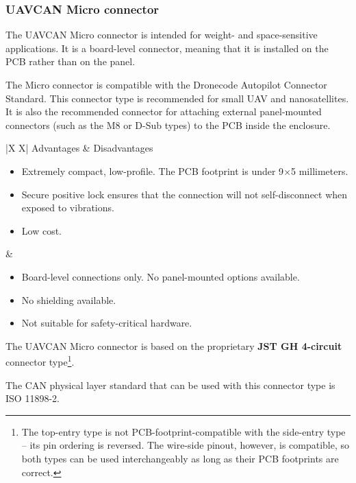 \clearpage  %
\subsubsection{UAVCAN Micro connector}

The UAVCAN Micro connector is intended for weight- and space-sensitive applications.
It is a board-level connector, meaning that it is installed on the PCB rather than on the panel.

The Micro connector is compatible with the Dronecode Autopilot Connector Standard.
This connector type is recommended for small UAV and nanosatellites.
It is also the recommended connector for attaching external panel-mounted connectors
(such as the M8 or D-Sub types) to the PCB inside the enclosure.

{
\NoLeftSkip
\begin{UAVCANCompactTable}{|X X|}
    Advantages & Disadvantages \\
    \begin{itemize}
        \item Extremely compact, low-profile. The PCB footprint is under 9$\times$5 millimeters.
        \item Secure positive lock ensures that the connection will not self-disconnect when exposed to vibrations.
        \item Low cost.
    \end{itemize}
    &
    \begin{itemize}
        \item Board-level connections only. No panel-mounted options available.
        \item No shielding available.
        \item Not suitable for safety-critical hardware.
    \end{itemize}
\end{UAVCANCompactTable}
}

The UAVCAN Micro connector is based on the proprietary \textbf{JST GH 4-circuit} connector type\footnote{%
    The top-entry type is not PCB-footprint-compatible with the side-entry type -- its pin ordering is reversed.
    The wire-side pinout, however, is compatible, so both types can be used interchangeably as long
    as their PCB footprints are correct.
}.

The CAN physical layer standard that can be used with this connector type is ISO 11898-2.

